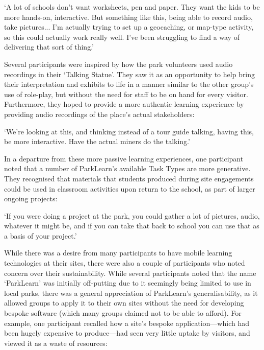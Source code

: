 \begin{displayquote}
`A lot of schools don't want worksheets, pen and paper. They want the kids to be more hands-on, interactive. But something like this, being able to record audio, take pictures... I'm actually trying to set up a geocaching, or map-type activity, so this could actually work really well. I've been struggling to find a way of delivering that sort of thing.'
\end{displayquote}

Several participants were inspired by how the park volunteers used audio recordings in their `Talking Statue'. They saw it as an opportunity to help bring their interpretation and exhibits to life in a manner similar to the other group's use of role-play, but without the need for staff to be on hand for every visitor. Furthermore, they hoped to provide a more authentic learning experience by providing audio recordings of the place's actual stakeholders:

\begin{displayquote}
`We're looking at this, and thinking instead of a tour guide talking, having this, be more interactive. Have the actual miners do the talking.'
\end{displayquote}

In a departure from these more passive learning experiences, one participant noted that a number of ParkLearn's available Task Types are more generative. They recognised that materials that students produced during site engagements could be used in classroom activities upon return to the school, as part of larger ongoing projects:

\begin{displayquote}
`If you were doing a project at the park, you could gather a lot of pictures, audio, whatever it might be, and if you can take that back to school you can use that as a basis of your project.'
\end{displayquote}

While there was a desire from many participants to have mobile learning technologies at their sites, there were also a couple of participants who noted concern over their sustainability. While several participants noted that the name `ParkLearn' was initially off-putting due to it seemingly being limited to use in local parks, there was a general appreciation of ParkLearn's generalisability, as it allowed groups to apply it to their own sites without the need for developing bespoke software (which many groups claimed not to be able to afford). For example, one participant recalled how a site's bespoke application---which had been hugely expensive to produce---had seen very little uptake by visitors, and viewed it as a waste of resources:

